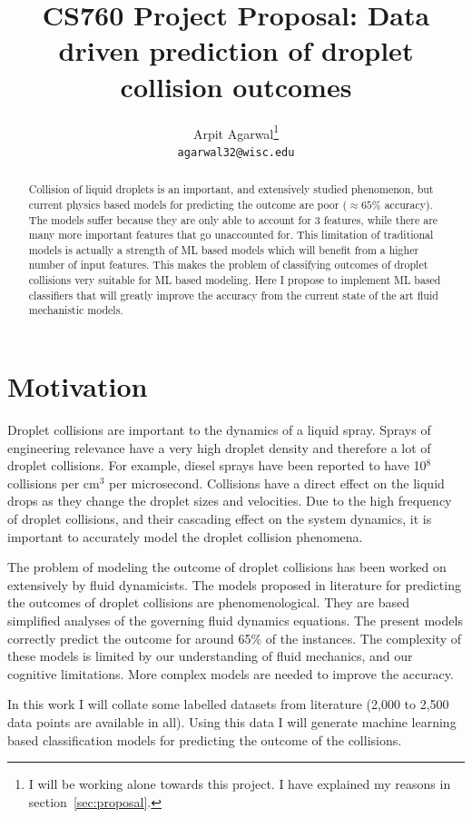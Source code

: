 \documentclass{article}
\title{CS760 Project Proposal: Data driven prediction of droplet collision outcomes}
\author{
  Arpit Agarwal\thanks{I will be working alone towards this project. I have explained my reasons in section~\ref{sec:proposal}.} \\
  \texttt{agarwal32@wisc.edu} \\
}
\begin{document}

\maketitle

\begin{abstract}
  Collision of liquid droplets is an important, and extensively studied phenomenon, but current physics based models for predicting the outcome are poor ($\approx 65\%$ accuracy). The models suffer because they are only able to account for 3 features, while there are many more important features that go unaccounted for. This limitation of traditional models is actually a strength of ML based models which will benefit from a higher number of input features. This makes the problem of classifying outcomes of droplet collisions very suitable for ML based modeling. Here I propose to implement ML based classifiers that will greatly improve the accuracy from the current state of the art fluid mechanistic models.
\end{abstract}

\section{Motivation}
Droplet collisions are important to the dynamics of a liquid spray. Sprays of engineering relevance have a very high droplet density and therefore a lot of droplet collisions. For example, diesel sprays have been reported to have 10$^8$  collisions per cm$^3$ per microsecond. Collisions have a direct effect on the liquid drops as they change the droplet sizes and velocities. Due to the high frequency of droplet collisions, and their cascading effect on the system dynamics, it is important to accurately model the droplet collision phenomena.

The problem of modeling the outcome of droplet collisions has been worked on extensively by fluid dynamicists. The models proposed in literature for predicting the outcomes of droplet collisions are phenomenological. They are based simplified analyses of the governing fluid dynamics equations. The present models correctly predict the outcome for around 65\% of the instances. The complexity of these models is limited by our understanding of fluid mechanics, and our cognitive limitations. More complex models are needed to improve the accuracy.

In this work I will collate some labelled datasets from literature (2,000 to 2,500 data points are available in all). Using this data I will generate machine learning based classification models for predicting the outcome of the collisions.
\end{document}
